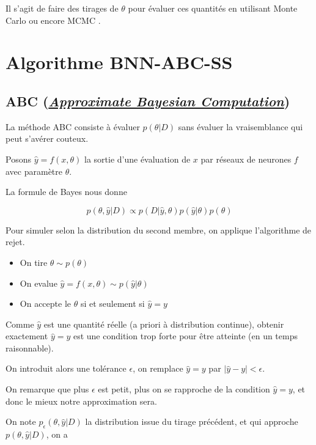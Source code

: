 \documentclass[french,12pt]{article}
\begin{document}
Il s'agit de faire des tirages de $\theta$ pour évaluer ces quantités en utilisant Monte Carlo ou
encore MCMC \cite{Uncertainty_Deep}.

\pagebreak

\section{Algorithme BNN-ABC-SS}

\subsection{ABC (\href{https://en.wikipedia.org/wiki/Approximate_Bayesian_computation}{\textit{Approximate Bayesian Computation}})}

La méthode ABC consiste à évaluer $p(\theta | D)$ sans évaluer
la vraisemblance qui peut s'avérer couteux.

Posons $\hat{y} = f(x, \theta)$ la sortie d'une évaluation de $x$ par
réseaux de neurones $f$ avec paramètre $\theta$.

La formule de Bayes nous donne

$$ p(\theta, \hat{y} | D) \propto p(D | \hat{y}, \theta) p(\hat{y} | \theta)
    p(\theta)$$

Pour simuler selon la distribution du second membre, on applique
l'algorithme de rejet.

\begin{itemize}
    \item On tire $\theta \sim p(\theta)$
    \item On evalue $\hat{y} = f(x , \theta) \sim p(\hat{y} | \theta)$
    \item On accepte le $\theta$ si et seulement si $\hat{y} = y$
\end{itemize}

Comme $\hat{y}$ est une quantité réelle (a priori à distribution continue),
obtenir exactement $\hat{y} = y$ est une condition trop forte
pour être atteinte (en un temps raisonnable).

On introduit alors une tolérance $\epsilon$, on remplace $\hat{y} = y$
par $|\hat{y} - y| < \epsilon$.

On remarque que plus $\epsilon$ est petit, plus on se rapproche de la condition $\hat{y} = y$,
et donc le mieux notre approximation sera.

On note $p_{\epsilon} (\theta, \hat{y} | D)$ la distribution issue
du tirage précédent, et qui approche $p(\theta, \hat{y} |D)$, on a
\end{document}

